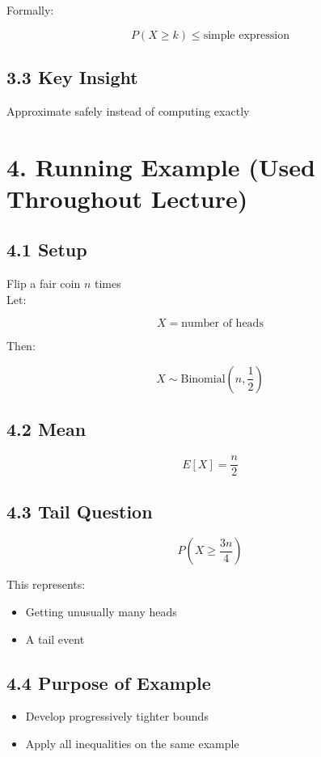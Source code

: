 \documentclass[12pt]{article}
\begin{document}
Formally:

\[
P(X \geq k) \leq \text{simple expression}
\]

\subsection*{3.3 Key Insight}

Approximate safely instead of computing exactly

\section*{4. Running Example (Used Throughout Lecture)}

\subsection*{4.1 Setup}

Flip a fair coin $n$ times \\
Let:

\[
X = \text{number of heads}
\]

Then:

\[
X \sim \text{Binomial}\left(n, \frac{1}{2}\right)
\]

\subsection*{4.2 Mean}

\[
E[X] = \frac{n}{2}
\]

\subsection*{4.3 Tail Question}

\[
P\left(X \geq \frac{3n}{4}\right)
\]

This represents:

\begin{itemize}
\item Getting unusually many heads
\item A tail event
\end{itemize}

\subsection*{4.4 Purpose of Example}

\begin{itemize}
\item Develop progressively tighter bounds
\item Apply all inequalities on the same example
\end{itemize}
\end{document}
